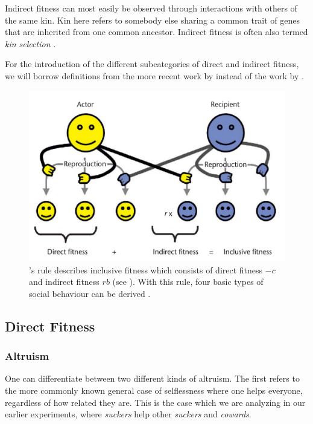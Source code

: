 \documentclass[sigconf]{acmart}
\newcommand{\cowards}{\textit{cowards}\xspace}
\newcommand{\suckers}{\textit{suckers}\xspace}
\begin{document}
    Indirect fitness can most easily be observed through interactions with others of the same kin.
    Kin here refers to somebody else sharing a common trait of genes that are inherited from one common ancestor.
    Indirect fitness is often also termed \textit{kin selection} \cite{west_altruism_2010}.

    For the introduction of the different subcategories of direct and indirect fitness, we will borrow definitions from the more recent work by \citeauthor{west_altruism_2010} \cite{west_altruism_2010} instead of the work by \citeauthor{gardner_theory_2009} \cite{gardner_theory_2009}.

    \begin{figure}
        \includegraphics[width=\columnwidth]{figures/hamiltons_rule}
        \caption{\citeauthor{hamilton_kin_1964}'s rule describes inclusive fitness which consists of direct fitness $-c$ and indirect fitness $rb$ (see ). With this rule, four basic types of social behaviour can be derived \cite{gardner_theory_2009}.}
        \label{fig:hamilton}
    \end{figure}

    \subsection{Direct Fitness}\label{subsec:direct_fit}

    \subsubsection{Altruism}
    One can differentiate between two different kinds of altruism.
    The first refers to the more commonly known general case of selflessness where one helps everyone, regardless of how related they are.
    This is the case which we are analyzing in our earlier experiments, where \suckers help other \suckers and \cowards.
\end{document}
